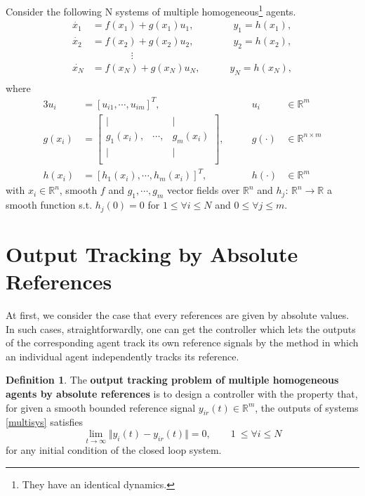 \documentclass[11pt, a4paper, oneside, openany, reqno]{book}
\theoremstyle{definition}
\newtheorem{definition}[theorem]{Definition}
\theoremstyle{remark}
\numberwithin{equation}{chapter} %
\newcommand{\R}{\ensuremath{{\mathbb R}}}
\begin{document}
Consider the following N systems of multiple homogeneous\footnote
{They have an identical dynamics.} agents.
\begin{equation}\begin{split}\label{multisys}
	\dot{x_1} &=f(x_1)+g(x_1)u_1, \qquad\qquad  y_1 = h(x_1), \\
	\dot{x_2} &=f(x_2)+g(x_2)u_2, \qquad\qquad  y_2 = h(x_2),\\
	& \qquad \qquad \vdots \\
	\dot{x_N} &=f(x_N)+g(x_N)u_N, \qquad\quad  y_N = h(x_N),\\
\end{split}\end{equation} 
where
\begin{alignat*}{3}
	u_i&=\left[u_{i1} ,\cdots ,u_{im}\right]^T ,  \qquad & u_i & \in \R^m \\
	g(x_i)&=\left[ \begin{array}{ccc}
	\vert & & \vert \\
	g_1 (x_i), & \cdots, & g_m (x_i) \\
	\vert & & \vert \\
	\end{array} \right],   \qquad & g(\cdot) & \in \R^{n \times m} \\
	h(x_i)&=\left[h_1 (x_i) ,\cdots ,h_m (x_i) \right]^T , \qquad & h(\cdot) & \in \R^m  
\end{alignat*} 
with $ x_i \in \R^n $,  
smooth $ f $ and $ g_1 ,\cdots, g_m $ vector fields over $\R^n$ 
and $ h_j $: $\R^n \rightarrow \R$ 
a smooth function s.t. $ h_j(0)=0 $ for
$ 1 \leq \forall i \leq N $ and $ 0 \leq \forall j \leq m $. 


\section{Output Tracking by Absolute References}

At first, we consider the case that every references are given by absolute values.
In such cases, straightforwardly, one can get the controller 
which lets the outputs of the corresponding agent track its own reference signals 
by the method in which an individual agent independently tracks its reference.

\begin{definition}
	The \textbf{output tracking problem of multiple homogeneous agents by absolute references} 
	is to design a controller with the property that, 
	for given a smooth bounded reference signal $ y_{ir}(t) \in \R^m$, 
	the outputs of systems \eqref{multisys} satisfies 
	\begin{equation}
	\lim_{t \to \infty}\Vert y_i(t)-y_{ir}(t) \Vert = 0, \qquad 1\ \leq \forall i \leq N 
	\end{equation}	
	for any initial condition of the closed loop system.
\end{definition}
\end{document}

